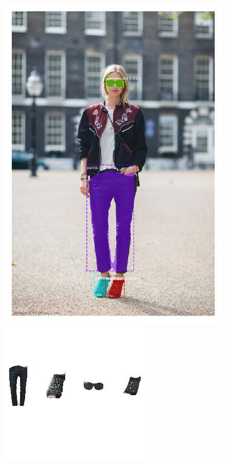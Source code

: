 \documentclass[12pt]{report}
\begin{document}
\begin{figure}
\begin{minipage}[b]{0.3\textwidth}
    \includegraphics[width=\textwidth]{images/resultados/1060077roupas.png}
    \caption{}
  \end{minipage}
    \hfill
  \begin{minipage}[b]{0.3\textwidth}
    \includegraphics[width=\textwidth]{images/resultados/1.png}

\end{minipage}
\end{figure}
\end{document}
